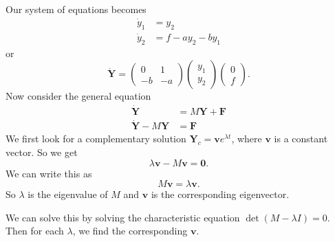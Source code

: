 \documentclass[a4paper]{article}
\begin{document}
Our system of equations becomes
\begin{align*}
  \dot y_1 &= y_2\\
  \dot y_2 &= f - a y_2 - by_1
\end{align*}
or
\[
  \mathbf{\dot{Y}} =
  \begin{pmatrix}
    0 & 1\\
    -b & -a
  \end{pmatrix}
  \begin{pmatrix}
    y_1\\y_2
  \end{pmatrix}
  \begin{pmatrix}
    0 \\ f
  \end{pmatrix}.
\]
Now consider the general equation
\begin{align*}
  \mathbf{\dot {Y}} &= M\mathbf{Y} + \mathbf{F}\\
  \mathbf{\dot {Y}} - M\mathbf{Y} &= \mathbf{F}
\end{align*}
We first look for a complementary solution $\mathbf{Y}_c = \mathbf{v} e^{\lambda t}$, where $\mathbf{v}$ is a constant vector. So we get
\[
  \lambda\mathbf{v} - M\mathbf{v} = \mathbf{0}.
\]
We can write this as
\[
  M\mathbf{v} = \lambda \mathbf{v}.
\]
So $\lambda$ is the eigenvalue of $M$ and $\mathbf{v}$ is the corresponding eigenvector.

We can solve this by solving the characteristic equation $\det(M - \lambda I) = 0$. Then for each $\lambda$, we find the corresponding $\mathbf{v}$.
\end{document}
